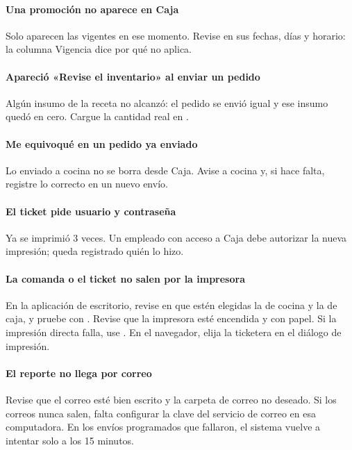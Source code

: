 \paragraph{Una promoción no aparece en Caja} Solo aparecen las vigentes en ese momento. Revise en  sus fechas, días y horario: la columna Vigencia dice por qué no aplica.

\paragraph{Apareció «Revise el inventario» al enviar un pedido} Algún insumo de la receta no alcanzó: el pedido se envió igual y ese insumo quedó en cero. Cargue la cantidad real en .

\paragraph{Me equivoqué en un pedido ya enviado} Lo enviado a cocina no se borra desde Caja. Avise a cocina y, si hace falta, registre lo correcto en un nuevo envío.

\paragraph{El ticket pide usuario y contraseña} Ya se imprimió 3 veces. Un empleado con acceso a Caja debe autorizar la nueva impresión; queda registrado quién lo hizo.

\paragraph{La comanda o el ticket no salen por la impresora} En la aplicación de escritorio, revise en  que estén elegidas la de cocina y la de caja, y pruebe con . Revise que la impresora esté encendida y con papel. Si la impresión directa falla, use . En el navegador, elija la ticketera en el diálogo de impresión.

\paragraph{El reporte no llega por correo} Revise que el correo esté bien escrito y la carpeta de correo no deseado. Si los correos nunca salen, falta configurar la clave del servicio de correo en esa computadora. En los envíos programados que fallaron, el sistema vuelve a intentar solo a los 15 minutos.

